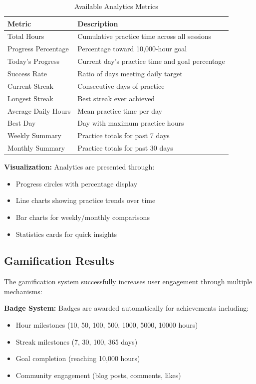 \documentclass[12pt,a4paper]{report}
\newcommand{\JustifiedNormal}{\fontsize{12}{14}\selectfont\justifying\setlength{\parindent}{0pt}}
\begin{document}
\begin{table}[H]
\centering
\caption{Available Analytics Metrics}
\begin{tabular}{|l|p{8cm}|}
\hline
\textbf{Metric} & \textbf{Description} \\
\hline
Total Hours & Cumulative practice time across all sessions \\
Progress Percentage & Percentage toward 10,000-hour goal \\
Today's Progress & Current day's practice time and goal percentage \\
Success Rate & Ratio of days meeting daily target \\
Current Streak & Consecutive days of practice \\
Longest Streak & Best streak ever achieved \\
Average Daily Hours & Mean practice time per day \\
Best Day & Day with maximum practice hours \\
Weekly Summary & Practice totals for past 7 days \\
Monthly Summary & Practice totals for past 30 days \\
\hline
\end{tabular}
\end{table}

\textbf{Visualization:} Analytics are presented through:
\begin{itemize}
  \item Progress circles with percentage display
  \item Line charts showing practice trends over time
  \item Bar charts for weekly/monthly comparisons
  \item Statistics cards for quick insights
\end{itemize}

\subsection{Gamification Results}
\JustifiedNormal
The gamification system successfully increases user engagement through multiple mechanisms:

\textbf{Badge System:} Badges are awarded automatically for achievements including:
\begin{itemize}
  \item Hour milestones (10, 50, 100, 500, 1000, 5000, 10000 hours)
  \item Streak milestones (7, 30, 100, 365 days)
  \item Goal completion (reaching 10,000 hours)
  \item Community engagement (blog posts, comments, likes)
\end{itemize}
\end{document}
